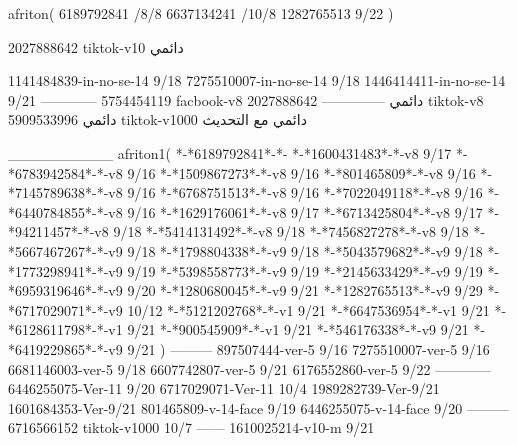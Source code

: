 afriton(
6189792841 /8/8
6637134241 /10/8
1282765513 9/22
)

2027888642 tiktok-v10
دائمي



1141484839-in-no-se-14 9/18
7275510007-in-no-se-14 9/18
1446414411-in-no-se-14 9/21
------------
5754454119 facbook-v8
دائمي
--------------
2027888642 tiktok-v8
دائمي
5909533996 tiktok-v1000
دائمي مع التحديث

__________
afriton1(
*-*6189792841*-*-
*-*1600431483*-*-v8 9/17
*-*6783942584*-*-v8 9/16
*-*1509867273*-*-v8 9/16
*-*801465809*-*-v8 9/16
*-*7145789638*-*-v8 9/16
*-*6768751513*-*-v8 9/16
*-*7022049118*-*-v8 9/16
*-*6440784855*-*-v8 9/16
*-*1629176061*-*-v8 9/17
*-*6713425804*-*-v8 9/17
*-*94211457*-*-v8 9/18
*-*5414131492*-*-v8 9/18
*-*7456827278*-*-v8 9/18
*-*5667467267*-*-v9 9/18
*-*1798804338*-*-v9 9/18
*-*5043579682*-*-v9 9/18
*-*1773298941*-*-v9 9/19
*-*5398558773*-*-v9 9/19
*-*2145633429*-*-v9 9/19
*-*6959319646*-*-v9 9/20
*-*1280680045*-*-v9 9/21
*-*1282765513*-*-v9 9/29
*-*6717029071*-*-v9 10/12
*-*5121202768*-*-v1 9/21
*-*6647536954*-*-v1 9/21
*-*6128611798*-*-v1 9/21
*-*900545909*-*-v1 9/21
*-*546176338*-*-v9 9/21
*-*6419229865*-*-v9 9/21
)
---------
897507444-ver-5 9/16
7275510007-ver-5 9/16
6681146003-ver-5 9/18
6607742807-ver-5 9/21
6176552860-ver-5 9/22
------------
6446255075-Ver-11
9/20
6717029071-Ver-11
10/4
1989282739-Ver-9/21
1601684353-Ver-9/21
801465809-v-14-face 9/19
6446255075-v-14-face 9/20
---------
6716566152 tiktok-v1000
10/7
------
1610025214-v10-m 9/21
